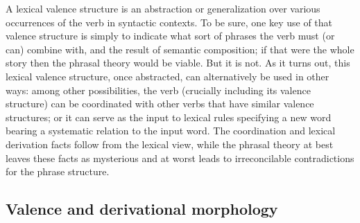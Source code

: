 A lexical valence structure is an abstraction or generalization over various occurrences of the verb
in syntactic contexts.  To be sure, one key use of that valence structure is simply to indicate what
sort of phrases the verb must (or can) combine with, and the result of semantic composition; if that
were the whole story then the phrasal theory would be viable.  But it is not.  As it turns out, this
lexical valence structure, once abstracted, can alternatively be used in other ways: among other
possibilities, the verb (crucially including its valence structure) can be coordinated with other
verbs that have similar valence structures; or it can serve as the input to lexical rules
specifying a new word bearing a systematic relation to the input word.  The coordination and lexical
derivation facts follow from the lexical view, while the phrasal theory at best leaves these facts
as mysterious and at worst leads to irreconcilable contradictions for the phrase structure.   


%
%
%


\subsection{Valence and derivational morphology}
\label{sec-val-morph}\label{sec-phrasal-LI}\label{sec-inheritance-passive-LFG}\label{sec-phrasal-LFG}

